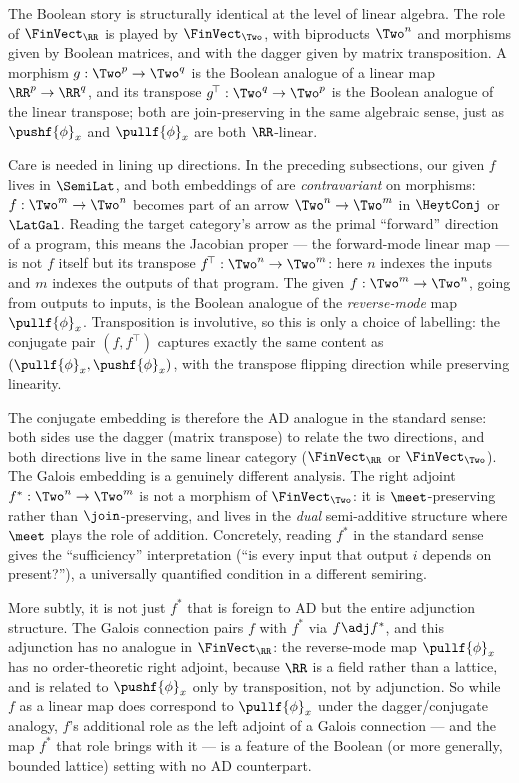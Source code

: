 The Boolean story is structurally identical at the level of linear algebra. The role of $\FinVect_\RR$ is
played by $\FinVect_\Two$, with biproducts $\Two^n$ and morphisms given by Boolean
matrices, and with the dagger given by matrix transposition. A morphism $g: \Two^p \to \Two^q$ is the
Boolean analogue of a linear map $\RR^p \to \RR^q$, and its transpose $g^{\!\top}: \Two^q \to \Two^p$ is the
Boolean analogue of the linear transpose; both are join-preserving in the same algebraic sense, just as
$\pushf{\phi}_x$ and $\pullf{\phi}_x$ are both $\RR$-linear.

Care is needed in lining up directions. In the preceding subsections, our given $f$ lives in
$\SemiLat$, and both embeddings of  are \emph{contravariant} on
morphisms: $f: \Two^m \to \Two^n$ becomes part of an arrow $\Two^n \to \Two^m$ in $\HeytConj$ or $\LatGal$.
Reading the target category's arrow as the primal ``forward'' direction of a program, this means the
Jacobian proper --- the forward-mode linear map --- is not $f$ itself but its transpose
$f^{\!\top}: \Two^n \to \Two^m$: here $n$ indexes the inputs and $m$ indexes the outputs of that program. The given $f: \Two^m \to \Two^n$, going from outputs to inputs, is
the Boolean analogue of the \emph{reverse-mode} map $\pullf{\phi}_x$. Transposition is involutive, so this
is only a choice of labelling: the conjugate pair $(f, f^{\!\top})$ captures exactly the same content as
$(\pullf{\phi}_x, \pushf{\phi}_x)$, with the transpose flipping direction while preserving linearity.

The conjugate embedding is therefore the AD analogue in the standard sense: both sides use the dagger
(matrix transpose) to relate the two directions, and both directions live in the same linear category
($\FinVect_\RR$ or $\FinVect_\Two$). The Galois embedding is a genuinely different analysis. The right
adjoint $f^*: \Two^n \to \Two^m$ is not a morphism of $\FinVect_\Two$: it is $\meet$-preserving rather than
$\join$-preserving, and lives in the \emph{dual} semi-additive structure where $\meet$ plays the role of
addition. Concretely, reading $f^*$ in the standard sense gives the ``sufficiency'' interpretation (``is
every input that output $i$ depends on present?''), a universally quantified condition in a different
semiring.

More subtly, it is not just $f^*$ that is foreign to AD but the entire adjunction structure. The Galois
connection pairs $f$ with $f^*$ via $f \adj f^*$, and this adjunction has no analogue in $\FinVect_\RR$: the
reverse-mode map $\pullf{\phi}_x$ has no order-theoretic right adjoint, because $\RR$ is a field rather than
a lattice, and is related to $\pushf{\phi}_x$ only by transposition, not by adjunction. So while $f$ as a
linear map does correspond to $\pullf{\phi}_x$ under the dagger/conjugate analogy, $f$'s additional role as
the left adjoint of a Galois connection --- and the map $f^*$ that role brings with it --- is a
feature of the Boolean (or more generally, bounded lattice) setting with no AD counterpart.

